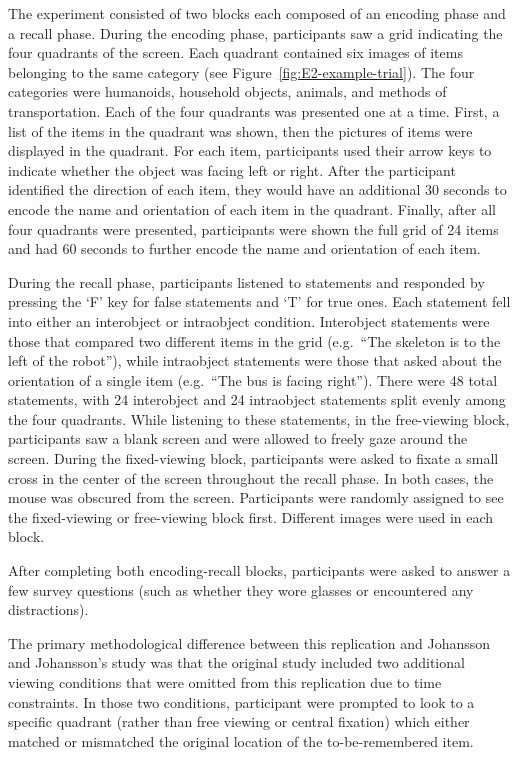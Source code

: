 \documentclass[
  man,floatsintext]{apa6}
\begin{document}
The experiment consisted of two blocks each composed of an encoding
phase and a recall phase. During the encoding phase, participants saw a
grid indicating the four quadrants of the screen. Each quadrant
contained six images of items belonging to the same category (see Figure~\ref{fig:E2-example-trial}).
The four categories were humanoids, household objects, animals, and
methods of transportation.
Each of the four quadrants was presented one at a time. First, a list of
the items in the quadrant was shown, then the pictures of items were displayed in the quadrant.
For each item, participants used their arrow keys to indicate whether the object was facing left or right. After the participant identified the direction of each
item, they would have an additional 30 seconds to encode the name and
orientation of each item in the quadrant. Finally, after all four quadrants
were presented, participants were shown the full grid of
24 items and had 60 seconds to further encode the name and orientation
of each item.

During the recall phase, participants listened to statements and
responded by pressing the `F' key for false statements and `T' for true
ones. Each statement fell into either an interobject or intraobject
condition. Interobject statements were those that compared two different
items in the grid (e.g.~``The skeleton is to the left of the robot''),
while intraobject statements were those that asked about the orientation
of a single item (e.g.~``The bus is facing right''). There were 48 total
statements, with 24 interobject and 24 intraobject statements split
evenly among the four quadrants. While listening to these statements, in
the free-viewing block, participants saw a blank screen and were allowed
to freely gaze around the screen. During the fixed-viewing block,
participants were asked to fixate a small cross in the center of the
screen throughout the recall phase. In both cases, the mouse was
obscured from the screen. Participants were randomly assigned to see the
fixed-viewing or free-viewing block first. Different images were used in each block.

After completing both encoding-recall blocks, participants were asked to
answer a few survey questions (such as whether they wore glasses or
encountered any distractions).

The primary methodological difference between this replication and
Johansson and Johansson's study was that the original study included two
additional viewing conditions that were omitted from this replication
due to time constraints. In those two conditions, participant were
prompted to look to a specific quadrant (rather than free viewing or
central fixation) which either matched or mismatched the original
location of the to-be-remembered item.
\end{document}
